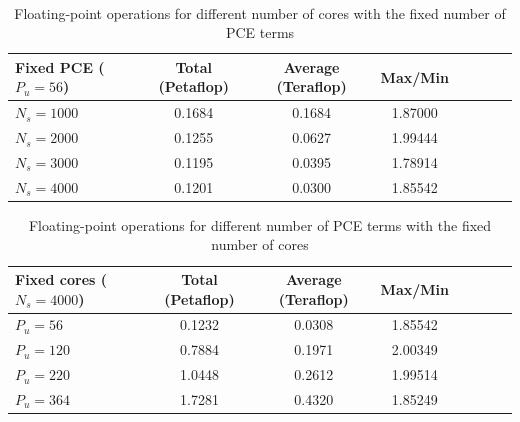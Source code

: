 \documentclass[letter,1p,11pt,oneside,onecolumn,sort&compress]{elsarticle}
\begin{document}
\

\begin{table}[htbp]
\centering
\begin{tabular}{l*{6}{c}r}
\hline
Fixed PCE ($P_u = 56$) & Total (Petaflop) & Average (Teraflop) & Max/Min \\
\hline
$N_s=1000$ & 0.1684 & 0.1684 & 1.87000 \\ \hline
$N_s=2000$ & 0.1255 & 0.0627 & 1.99444 \\ \hline
$N_s=3000$ & 0.1195 & 0.0395 & 1.78914 \\ \hline
$N_s=4000$ & 0.1201 & 0.0300 & 1.85542 \\
\hline
\end{tabular}
\caption{Floating-point operations for different number of cores with the fixed number of PCE terms}
\label{table:tableCP31}
\end{table}

\begin{table}[htbp]
\centering
\begin{tabular}{l*{6}{c}r}
\hline
Fixed cores ($N_s = 4000$) & Total (Petaflop) & Average (Teraflop) & Max/Min \\
\hline
$P_u=56$  & 0.1232 & 0.0308  & 1.85542  \\ \hline
$P_u=120$ & 0.7884 & 0.1971 & 2.00349 \\ \hline
$P_u=220$ & 1.0448 & 0.2612 & 1.99514 \\ \hline
$P_u=364$ & 1.7281 & 0.4320 & 1.85249 \\
\hline
\end{tabular}
\caption{Floating-point operations for different number of PCE terms with the fixed number of cores}
\label{table:tableCP32}
\end{table}
\end{document}
